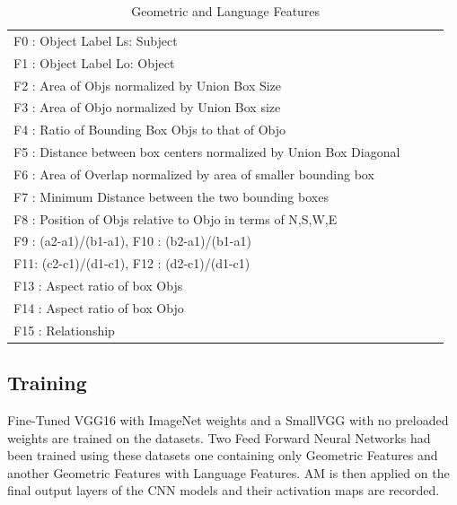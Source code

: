 \documentclass{IEEEtran}
\begin{document}
\begin{table}[!htbp]
\centering
\begin{tabular}{|l|lll}
\cline{1-1}
F0 : Object Label Ls: Subject \\ \cline{1-1}
F1 : Object Label Lo: Object  \\ \cline{1-1}
F2 : Area of Objs normalized by Union Box Size \\ \cline{1-1}
F3 : Area of Objo normalized by Union Box size \\ \cline{1-1}
F4 : Ratio of Bounding Box Objs to that of Objo  \\ \cline{1-1}
F5 : Distance between box centers normalized by Union Box Diagonal \\ \cline{1-1}
F6 : Area of Overlap normalized by area of smaller bounding box \\ \cline{1-1}
F7 : Minimum Distance between the two bounding boxes \\ \cline{1-1}
F8 : Position of Objs relative to Objo in terms of N,S,W,E \\ \cline{1-1}
F9 : (a2-a1)/(b1-a1), F10 : (b2-a1)/(b1-a1) \\ \cline{1-1}
F11: (c2-c1)/(d1-c1), F12 : (d2-c1)/(d1-c1) \\ \cline{1-1}
F13 : Aspect ratio of box Objs \\ \cline{1-1}
F14 : Aspect ratio of box Objo \\ \cline{1-1}
F15 : Relationship \\ \cline{1-1}
\end{tabular}
\caption{Geometric and Language Features}
\end{table}
\normalsize

\subsection{Training}
Fine-Tuned VGG16 with ImageNet weights and a SmallVGG with no preloaded weights are trained on the datasets. Two Feed Forward Neural Networks had been trained using these datasets one containing only Geometric Features and another Geometric Features with Language Features. AM is then applied on the final output layers of the CNN models and their activation maps are recorded.
\end{document}
